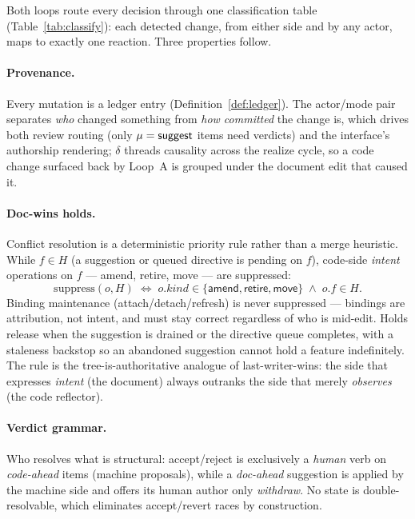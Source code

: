 Both loops route every decision through one classification table
(Table~\ref{tab:classify}): each detected change, from either side and by any
actor, maps to exactly one reaction. Three properties follow.

\paragraph{Provenance.} Every mutation is a ledger entry
(Definition~\ref{def:ledger}). The actor/mode pair separates \emph{who} changed
something from \emph{how committed} the change is, which drives both review
routing (only $\mu = \textsf{suggest}$ items need verdicts) and the interface's
authorship rendering; $\delta$ threads causality across the realize cycle, so
a code change surfaced back by Loop~A is grouped under the document edit that
caused it.

\paragraph{Doc-wins holds.} Conflict resolution is a deterministic priority
rule rather than a merge heuristic. While $f \in H$ (a suggestion or queued
directive is pending on $f$), code-side \emph{intent} operations on $f$ ---
\textsf{amend}, \textsf{retire}, \textsf{move} --- are suppressed:
\begin{equation}
\label{eq:docwins}
\mathrm{suppress}(o, H) \;\iff\;
o.\mathit{kind} \in \{\textsf{amend}, \textsf{retire}, \textsf{move}\}
\;\wedge\; o.f \in H .
\end{equation}
Binding maintenance (\textsf{attach}/\textsf{detach}/\textsf{refresh}) is never
suppressed --- bindings are attribution, not intent, and must stay correct
regardless of who is mid-edit. Holds release when the suggestion is drained or
the directive queue completes, with a staleness backstop so an abandoned
suggestion cannot hold a feature indefinitely. The rule is the
tree-is-authoritative analogue of last-writer-wins: the side that expresses
\emph{intent} (the document) always outranks the side that merely
\emph{observes} (the code reflector).

\paragraph{Verdict grammar.} Who resolves what is structural:
accept/reject is exclusively a \emph{human} verb on \emph{code-ahead} items
(machine proposals), while a \emph{doc-ahead} suggestion is applied by the
machine side and offers its human author only \emph{withdraw}. No state is
double-resolvable, which eliminates accept/revert races by construction.

